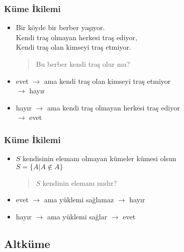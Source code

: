 \documentclass[dvipsnames]{beamer}
\theoremstyle{definition}
\theoremstyle{example}
\theoremstyle{plain}
\begin{document}
\begin{frame}
  \frametitle{Küme İkilemi}

  \begin{itemize}
    \item Bir köyde bir berber yaşıyor.\\
      Kendi traş olmayan herkesi traş ediyor,\\
      Kendi traş olan kimseyi traş etmiyor.

    \begin{quote}
      Bu berber kendi traş olur mu?
    \end{quote}

    \pause
    \item evet $\rightarrow$ ama kendi traş olan kimseyi traş etmiyor\\
      $\rightarrow$ hayır

    \pause
    \item hayır $\rightarrow$ ama kendi traş olmayan herkesi traş ediyor\\
      $\rightarrow$ evet
  \end{itemize}
\end{frame}

\begin{frame}
  \frametitle{Küme İkilemi}

  \begin{itemize}
    \item $S$ kendisinin elemanı olmayan kümeler kümesi olsun\\
      $S = \{A | A \notin A\}$

    \pause
    \begin{quote}
      $S$ kendinin elemanı mıdır?
    \end{quote}

    \pause
    \item evet $\rightarrow$ ama yüklemi sağlamaz $\rightarrow$ hayır

    \pause
    \item hayır $\rightarrow$ ama yüklemi sağlar $\rightarrow$ evet
  \end{itemize}
\end{frame}

\subsection{Altküme}
\end{document}
